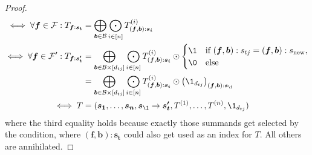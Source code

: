 \begin{proof}
\begin{align*}
        \iff \forall \bm{f} \in \mathcal{F}: T_{\bm{f}:\bm{s_t}}   & = \bigoplus\limits_{\bm{b} \in \mathcal{B}} \bigodot\limits_{i \in [n]} T^{(i)}_{(\bm{f}, \bm{b}):\bm{s_i}}                                                                             \\
        \iff \forall \bm{f} \in \mathcal{F}': T_{\bm{f}:\bm{s'_t}} & = \bigoplus\limits_{\bm{b} \in \mathcal{B} \times [d_{tj}]} \bigodot\limits_{i \in [n]} T^{(i)}_{(\bm{f}, \bm{b}):\bm{s_i}} \odot \begin{cases}
            \1 & \text{if $(\bm{f}, \bm{b}): s_{tj} = (\bm{f}, \bm{b}): s_{\text{new}}$}, \\
            \0 & \text{else}
        \end{cases}                             \\
                                                                   & = \bigoplus\limits_{\bm{b} \in \mathcal{B} \times [d_{tj}]} \bigodot\limits_{i \in [n]} T^{(i)}_{(\bm{f}, \bm{b}):\bm{s_i}} \odot \left(\1_{d_{tj}}\right)_{(\bm{f}, \bm{b}):\bm{s_\1}} \\
        \iff T                                                     & = (\bm{s_1}, \dots, \bm{s_n}, \bm{s_\1} \rightarrow \bm{s'_t}, T^{(1)}, \dots, T^{(n)}, \1_{d_{tj}})
    \end{align*}
    where the third equality holds because exactly those summands get selected by the condition, where $(\bm{f}, \bm{b}):\bm{s_t}$ could also get used as an index for $T$.
    All others are annihilated.
\end{proof}
\bigskip